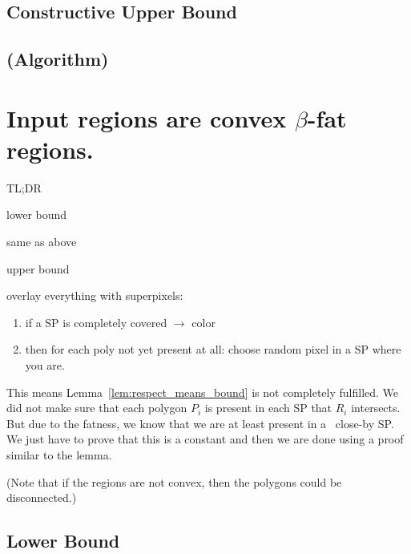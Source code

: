 \documentclass[a4paper, UKenglish]{lipics-v2018}
\begin{document}

\subsection{Constructive Upper Bound}
\label{sub:points_upper}




\subsection{(Algorithm)}
\label{sub:points_algo}







\section{Input regions are convex $\beta$-fat regions.}
\label{sec:fat}
TL;DR

lower bound

same as above

upper bound

overlay everything with superpixels:
\begin{enumerate}
	\item if a SP is completely covered $\rightarrow$ color
	\item then for each poly not yet present at all: choose random pixel in a SP where you are.
\end{enumerate}
This means Lemma~\ref{lem:respect_means_bound} is not completely fulfilled. We did not make sure that each polygon $P_i$ is present in each SP that $R_i$ intersects. But due to the fatness, we know that we are at least present in a ~close-by SP. We just have to prove that this is a constant and then we are done using a proof similar to the lemma.


(Note that if the regions are not convex, then the polygons could be disconnected.)


\subsection{Lower Bound}
\label{sub:fat_lower}
\end{document}
